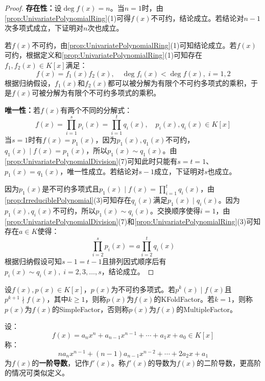 \begin{proof}
	\textbf{存在性：}设$\deg f(x)=n$。当$n=1$时，由\cref{prop:UnivariatePolynomialRing}(1)可得$f(x)$不可约，结论成立。若结论对$n-1$次多项式成立，下证明对$n$次也成立。\par
	若$f(x)$不可约，由\cref{prop:UnivariatePolynomialRing}(1)可知结论成立。若$f(x)$可约，根据定义和\cref{prop:UnivariatePolynomialRing}(1)可知存在$f_1,f_2(x)\in K[x]$满足：
	\begin{equation*}
		f(x)=f_1(x)f_2(x),\quad\deg f_i(x)<\deg f(x),\;i=1,2
	\end{equation*}
	根据归纳假设，$f_1(x)$和$f_2(x)$都可以被分解为有限个不可约多项式的乘积，于是$f(x)$可被分解为有限个不可约多项式的乘积。\par
	\textbf{唯一性：}若$f(x)$有两个不同的分解式：
	\begin{equation*}
		f(x)=\prod_{i=1}^{s}p_i(x)=\prod_{i=1}^{t}q_i(x),\quad p_i(x),q_i(x)\in K[x]
	\end{equation*}
	当$s=1$时有$f(x)=p_1(x)$，因为$p_1(x),q_1(x)$不可约，$q_1(x)\mid f(x)=p_1(x)$，所以$p_1(x)\sim q_1(x)$。由\cref{prop:UnivariatePolynomialDivision}(7)可知此时只能有$s=t=1$、$p_1(x)=q_1(x)$，唯一性成立。若结论对$s-1$成立，下证明对$s$也成立。\par
	因为$p_1(x)$是不可约多项式且$p_1(x)\mid f(x)=\prod\limits_{i=1}^{t}q_i(x)$，由\cref{prop:IrreduciblePolynomial}(3)可知存在$q_i(x)$满足$p_1(x)\mid q_i(x)$。因为$p_1(x),q_i(x)$不可约，所以$p_1(x)\sim q_i(x)$。交换顺序使得$i=1$，由\cref{prop:UnivariatePolynomialDivision}(7)和\cref{prop:UnivariatePolynomialRing}(3)可知存在$a\in K$使得：
	\begin{equation*}
		\prod_{i=2}^{s}p_i(x)=a\prod_{i=2}^{t}q_i(x)
	\end{equation*}
	根据归纳假设可知$s-1=t-1$且排列因式顺序后有$p_i(x)\sim q_i(x),\;i=2,3,\dots,s$，结论成立。
\end{proof}
\begin{definition}
	设$f(x),p(x)\in K[x]$，$p(x)$为不可约多项式。若$p^k(x)\mid f(x)$且$p^{k+1}\nmid f(x)$，其中$k\geqslant1$，则称$p(x)$为$f(x)$的\gls{KFoldFactor}。若$k=1$，则称$p(x)$为$f(x)$的\gls{SimpleFactor}，否则称$p(x)$为$f(x)$的\gls{MultipleFactor}。
\end{definition}
\begin{definition}
	设：
	\begin{equation*}
		f(x)=a_nx^n+a_{n-1}x^{n-1}+\cdots+a_1x+a_0\in K[x]
	\end{equation*}
	称：
	\begin{equation*}
		na_nx^{n-1}+(n-1)a_{n-1}x^{n-2}+\cdots+2a_2x+a_1
	\end{equation*}
	为$f(x)$的\textbf{一阶导数}，记作$f'(x)$。称$f'(x)$的导数为$f(x)$的二阶导数，更高阶的情况可类似定义。
\end{definition}
